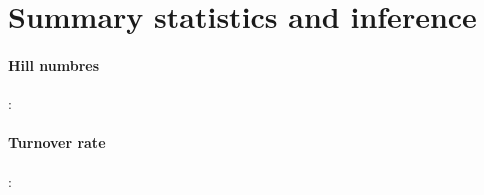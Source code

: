 \documentclass[11pt,a4paper]{article}
\begin{document}
\section{Summary statistics and inference}

\paragraph{Hill numbres}:
\paragraph{Turnover rate}:
\end{document}
